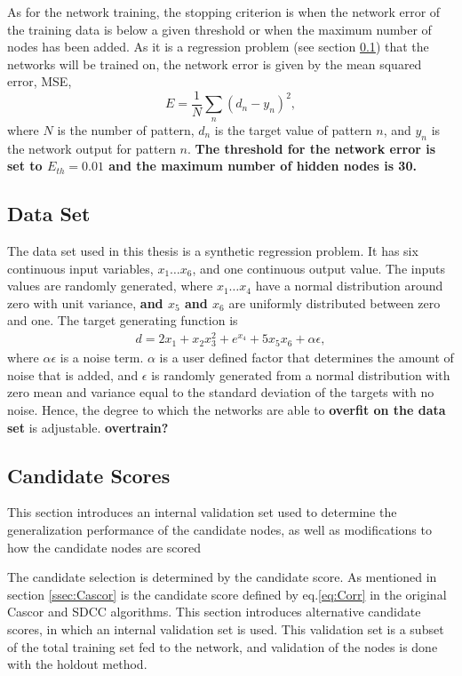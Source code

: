\documentclass[a4paper,11pt, usenatbib]{article}
\begin{document}
As for the network training, the stopping criterion is when the network error of the training data is below a given threshold or when the maximum number of nodes has been added. As it is a regression problem (see section \ref{ssec:Data Set}) that the networks will be trained on, the network error is given by the mean squared error, MSE, 
\begin{equation}
    E=\frac{1}{N}\sum_n(d_n-y_n)^2,
\end{equation}
where $N$ is the number of pattern, $d_n$ is the target value of pattern $n$, and $y_n$ is the network output for pattern $n$. \textbf{The threshold for the network error is set to $E_{th}=0.01$ and the maximum number of hidden nodes is 30.}
\subsection{Data Set}
\label{ssec:Data Set}
The data set used in this thesis is a synthetic regression problem. It has six continuous input variables, $x_1\ldots x_6$, and one continuous output value. The inputs values are randomly generated, where $x_1\ldots x_4$ have a normal distribution around zero with unit variance, \textbf{and $x_5$ and $x_6$} are uniformly distributed between zero and one. The target generating function is 
\begin{equation}
    \begin{aligned}
    d=2x_1+x_2x_3^2+e^{x_4}+5x_5x_6+\alpha\epsilon,
    \end{aligned}
\end{equation}
where $\alpha\epsilon$ is a noise term. $\alpha$ is a user defined factor that determines the amount of noise that is added, and $\epsilon$ is randomly generated from a normal distribution with zero mean and variance equal to the standard deviation of the targets with no noise. Hence, the degree to which the networks are able to \textbf{overfit on the data set} is adjustable. \textbf{overtrain?}


\subsection{Candidate Scores}
\label{ssec:Candidate Scores}
This section introduces an internal validation set used to determine the generalization performance of the candidate nodes, as well as modifications to how the candidate nodes are scored 

The candidate selection is determined by the candidate score. As mentioned in section \ref{ssec:Cascor} is the candidate score defined by eq.\eqref{eq:Corr} in the original Cascor and SDCC algorithms. This section introduces alternative candidate scores, in which an internal validation set is used. This validation set is a subset of the total training set fed to the network, and validation of the nodes is done with the holdout method.
  
\end{document}
